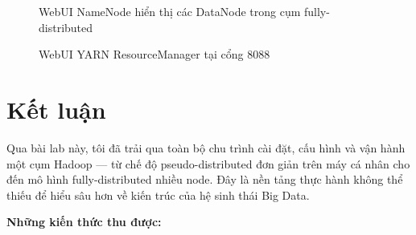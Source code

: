 \documentclass[12pt]{article}
\begin{document}
\begin{figure}[H]
  \centering
  \caption{WebUI NameNode hiển thị các DataNode trong cụm fully-distributed}
  \label{fig:webui-cluster}
\end{figure}

\begin{figure}[H]
  \centering
  \caption{WebUI YARN ResourceManager tại cổng 8088}
  \label{fig:webui-yarn}
\end{figure}

\section{Kết luận}

Qua bài lab này, tôi đã trải qua toàn bộ chu trình cài đặt, cấu hình và vận hành
một cụm Hadoop — từ chế độ pseudo-distributed đơn giản trên máy cá nhân cho đến
mô hình fully-distributed nhiều node. Đây là nền tảng thực hành không thể thiếu
để hiểu sâu hơn về kiến trúc của hệ sinh thái Big Data.

\textbf{Những kiến thức thu được:}
\end{document}
